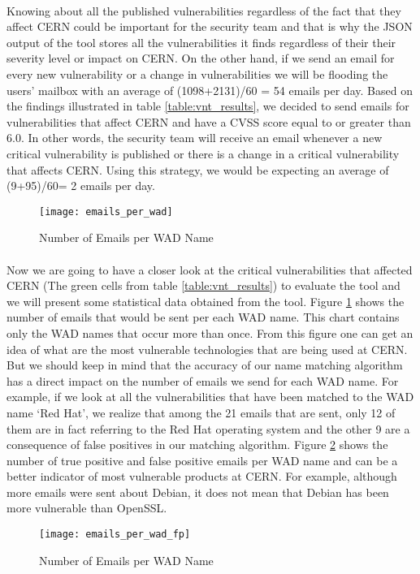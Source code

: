 \paragraph{}
Knowing about all the published vulnerabilities regardless of the fact that they affect CERN could be important for the security team and that is why the JSON output of the tool stores all the vulnerabilities it finds regardless of their their severity level or impact on CERN. On the other hand, if we send an email for every new vulnerability or a change in vulnerabilities we will be flooding the users' mailbox with an average of (1098+2131)/60 = 54 emails per day. Based on the findings illustrated in table \ref{table:vnt_results}, we decided to send emails for vulnerabilities that affect CERN and have a CVSS score equal to or greater than 6.0. In other words, the security team will receive an email whenever a new critical vulnerability is published or there is a change in a critical vulnerability that affects CERN. Using this strategy, we would be expecting an average of (9+95)/60= 2 emails per day. 
\begin{figure}[h!]
\label{figure:emails_per_wad}
  \centering
    \texttt{[image: emails\_per\_wad]}
  \caption{Number of Emails per WAD Name}
\end{figure}

\paragraph{}
Now we are going to have a closer look at the critical vulnerabilities that affected CERN (The green cells from table \ref{table:vnt_results}) to evaluate the tool and we will present some statistical data obtained from the tool.
Figure \ref{figure:emails_per_wad} shows the number of emails that would be sent per each WAD name. This chart contains only the WAD names that occur more than once. From this figure one can get an idea of what are the most vulnerable technologies that are being used at CERN. But we should keep in mind that the accuracy of our name matching algorithm has a direct impact on the number of emails we send for each WAD name. For example, if we look at all the vulnerabilities that have been matched to the WAD name `Red Hat', we realize that among the 21 emails that are sent, only 12 of them are in fact referring to the Red Hat operating system and the  other 9 are a consequence of false positives in our matching algorithm. Figure \ref{figure:emails_per_wad_fp} shows the number of true positive and false positive emails per WAD name and can be a better indicator of most vulnerable products at CERN. For example, although more emails were sent about Debian, it does not mean that Debian has been more vulnerable than OpenSSL.
\\
\begin{figure}[h!]
\label{figure:emails_per_wad_fp}
  \centering
    \texttt{[image: emails\_per\_wad\_fp]}
  \caption{Number of Emails per WAD Name}
\end{figure}


